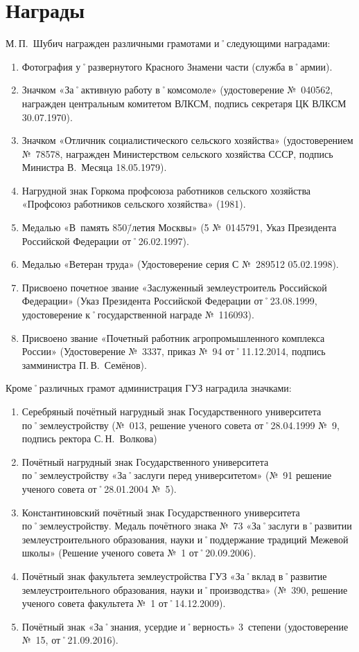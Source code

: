 ﻿\section{Награды}
\noindent М.\,П.~Шубич награжден различными грамотами и˚следующими наградами: 

\begin{enumerate}
	\item Фотография у˚развернутого Красного Знамени части (служба в˚армии).
	\item Значком «За˚активную работу в˚комсомоле» (удостоверение №~040562, награжден центральным комитетом ВЛКСМ, подпись секретаря ЦК ВЛКСМ 30.07.1970).
	\item Значком «Отличник социалистического сельского хозяйства» (удостоверением №~78578, награжден Министерством сельского хозяйства СССР, подпись Министра В.~Месяца 18.05.1979).
	\item Нагрудной знак Горкома профсоюза работников сельского хозяйства «Профсоюз работников сельского хозяйства» (1981).
	\item Медалью «В~память 850\=/летия Москвы» (5 №~0145791, Указ Президента Российской Федерации от˚26.02.1997).
	\item Медалью «Ветеран труда» (Удостоверение серия С №~289512 05.02.1998).
	\item Присвоено почетное звание «Заслуженный землеустроитель Российской Федерации» (Указ Президента Российской Федерации от˚23.08.1999, удостоверение к˚государственной награде №~116093).
	\item Присвоено звание «Почетный работник агропромышленного комплекса России» (Удостоверение №~3337, приказ №~94 от˚11.12.2014, подпись замминистра П.\,В.~Семёнов).
\end{enumerate}

\noindent Кроме˚различных грамот администрация ГУЗ наградила значками:
\begin{enumerate}	
	\item Серебряный почётный нагрудный знак Государственного университета по˚землеустройству (№~013, решение ученого совета от˚28.04.1999 №~9, подпись ректора С.\,Н.~Волкова) 
	\item Почётный нагрудный знак Государственного университета по˚землеустройству «За˚заслуги перед университетом» (№~91 решение ученого совета от˚28.01.2004 №~5).
	\item Константиновский почётный знак Государственного университета по˚землеустройству. Медаль почётного знака №~73 «За˚заслуги в˚развитии землеустроительного образования, науки и˚поддержание традиций Межевой школы» (Решение ученого совета №~1 от˚20.09.2006).
	\item Почётный знак факультета землеустройства ГУЗ «За˚вклад в˚развитие землеустроительного образования, науки и˚производства» (№~390, решение ученого совета факультета №~1 от˚14.12.2009).
	\item Почётный знак «За˚знания, усердие и˚верность» 3~степени (удостоверение №~15, от˚21.09.2016). 
\end{enumerate}

